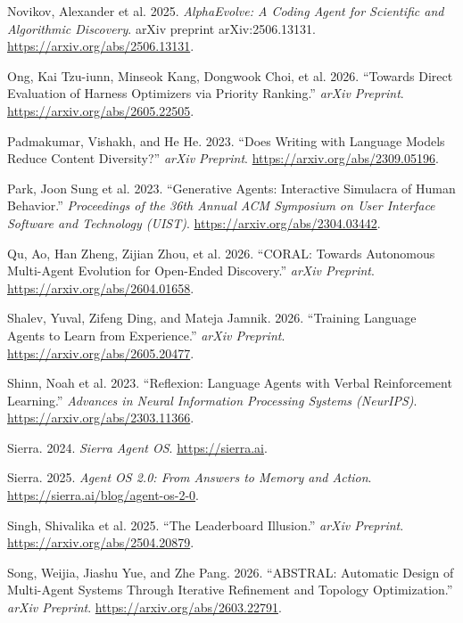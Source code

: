 \documentclass[
]{article}
\newlength{\cslhangindent}
\newenvironment{CSLReferences}[2] %
 {\begin{list}{}{%
  \setlength{\itemindent}{0pt}
  \setlength{\leftmargin}{0pt}
  \setlength{\parsep}{0pt}
  \ifodd #1
   \setlength{\leftmargin}{\cslhangindent}
   \setlength{\itemindent}{-1\cslhangindent}
  \fi
  \setlength{\itemsep}{#2\baselineskip}}}
 {\end{list}}
\begin{document}
\begin{CSLReferences}{1}{1}
{Novikov, Alexander et al.} 2025. \emph{{AlphaEvolve}: A Coding Agent
for Scientific and Algorithmic Discovery}. arXiv preprint
arXiv:2506.13131. \url{https://arxiv.org/abs/2506.13131}.

Ong, Kai Tzu-iunn, Minseok Kang, Dongwook Choi, et al. 2026. {``Towards
Direct Evaluation of Harness Optimizers via Priority Ranking.''}
\emph{arXiv Preprint}. \url{https://arxiv.org/abs/2605.22505}.

Padmakumar, Vishakh, and He He. 2023. {``Does Writing with Language
Models Reduce Content Diversity?''} \emph{arXiv Preprint}.
\url{https://arxiv.org/abs/2309.05196}.

{Park, Joon Sung et al.} 2023. {``Generative Agents: Interactive
Simulacra of Human Behavior.''} \emph{Proceedings of the 36th Annual ACM
Symposium on User Interface Software and Technology (UIST)}.
\url{https://arxiv.org/abs/2304.03442}.

Qu, Ao, Han Zheng, Zijian Zhou, et al. 2026. {``{CORAL}: Towards
Autonomous Multi-Agent Evolution for Open-Ended Discovery.''}
\emph{arXiv Preprint}. \url{https://arxiv.org/abs/2604.01658}.

Shalev, Yuval, Zifeng Ding, and Mateja Jamnik. 2026. {``Training
Language Agents to Learn from Experience.''} \emph{arXiv Preprint}.
\url{https://arxiv.org/abs/2605.20477}.

{Shinn, Noah et al.} 2023. {``Reflexion: Language Agents with Verbal
Reinforcement Learning.''} \emph{Advances in Neural Information
Processing Systems (NeurIPS)}. \url{https://arxiv.org/abs/2303.11366}.

Sierra. 2024. \emph{Sierra Agent OS}. \url{https://sierra.ai}.

Sierra. 2025. \emph{Agent {OS} 2.0: From Answers to Memory and Action}.
\url{https://sierra.ai/blog/agent-os-2-0}.

{Singh, Shivalika et al.} 2025. {``The Leaderboard Illusion.''}
\emph{arXiv Preprint}. \url{https://arxiv.org/abs/2504.20879}.

Song, Weijia, Jiashu Yue, and Zhe Pang. 2026. {``{ABSTRAL}: Automatic
Design of Multi-Agent Systems Through Iterative Refinement and Topology
Optimization.''} \emph{arXiv Preprint}.
\url{https://arxiv.org/abs/2603.22791}.


\end{CSLReferences}
\end{document}
